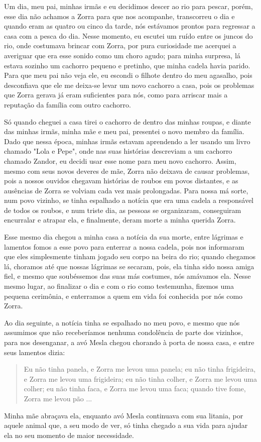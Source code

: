 Um dia, meu pai, minhas irmãs e eu decidimos descer ao rio para pescar, porém, esse dia não achamos a Zorra para que nos acompanhe, transcorreu o dia e quando eram as quatro ou cinco da tarde, nós estávamos prontos para regressar a casa com a pesca do dia. Nesse momento, eu escutei um ruído entre os juncos do rio, onde costumava brincar com Zorra, por pura curiosidade me acerquei a averiguar que era esse sonido como um choro agudo; para minha surpresa, lá estava sozinho um cachorro pequeno e pretinho, que minha cadela havia parido.  
Para que meu pai não veja ele, eu escondi o filhote dentro do meu agasalho, pois desconfiava que ele me deixa-se levar um novo cachorro a casa, pois os problemas que Zorra gerava já eram suficientes para nós, como para arriscar mais a reputação da família com outro cachorro.

Só quando cheguei a casa tirei o cachorro de dentro das minhas roupas, e diante das minhas irmãs, minha mãe e meu pai, presentei o novo membro da família. Dado que nessa época, minhas irmãs estavam aprendendo a ler usando um livro chamado "Lola e Pepe", onde nas suas histórias descreviam a um cachorro chamado Zandor, eu decidi usar esse nome para meu novo cachorro. 
Assim, mesmo com seus novos deveres de mãe, Zorra não deixava de causar problemas, pois a nossos ouvidos chegavam histórias de roubos em povos distantes, e as ausências de Zorra se volviam cada vez mais prolongadas.
Para nossa má sorte, num povo vizinho, se tinha espalhado a notícia que era uma cadela a responsável de todos os roubos, e num triste dia, as pessoas se organizaram, conseguiram encurralar e atrapar ela, e finalmente, deram morte a minha querida Zorra.

Esse mesmo dia chegou a minha casa a notícia da sua morte, entre lágrimas e lamentos fomos a esse povo para enterrar a nossa cadela, pois nos informaram que eles simplesmente tinham jogado seu corpo na beira do rio; quando chegamos lá, choramos até que nossas lágrimas se secaram, pois, ela tinha sido nossa amiga fiel, e mesmo que soubéssemos das suas más costumes, nós amávamos ela.
Nesse mesmo lugar, ao finalizar o dia e com o rio como testemunha, fizemos uma pequena cerimônia, e enterramos a quem em vida foi conhecida por nós como Zorra.

Ao dia seguinte, a notícia tinha se espalhado no meu povo, e mesmo que nós assumimos que não receberíamos nenhuma condolência de parte dos vizinhos, para nos desenganar, a avó Mesla chegou chorando à porta de nossa casa, e entre seus lamentos dizia:
\begin{quotation}
Eu não tinha panela, e Zorra me levou uma panela; 
eu não tinha frigideira, e Zorra me levou uma frigideira; 
eu não tinha colher, e Zorra me levou uma colher;
eu não tinha faca, e Zorra me levou uma faca;
quando tive fome, Zorra me levou pão ...  
\end{quotation}
Minha mãe abraçava ela, enquanto avó Mesla continuava com sua litania, por aquele animal que, a seu modo de ver, só tinha chegado a sua vida para ajudar ela no seu momento de maior necessidade.
 

